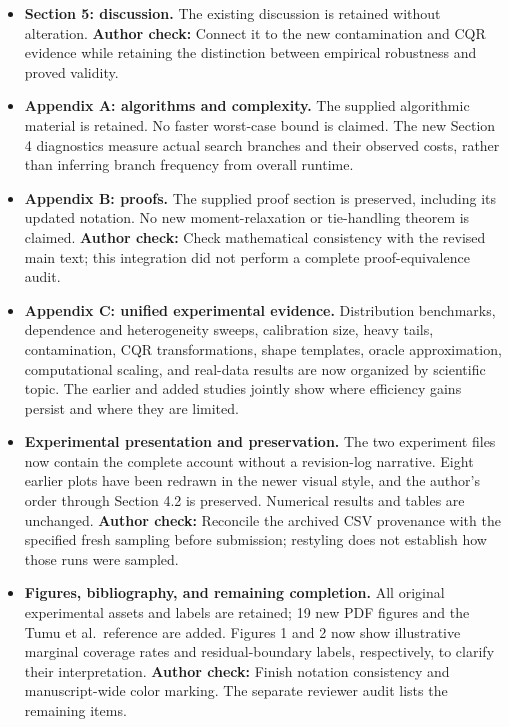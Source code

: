 \documentclass[10pt]{article}
\newcommand{\checkauthor}[1]{\textcolor{red!65!black}{\textbf{Author check:} #1}}
\begin{document}
\begin{itemize}
\item \textbf{Section 5: discussion.}
The existing discussion is retained without alteration.
\checkauthor{Connect it to the new contamination and CQR evidence while
retaining the distinction between empirical robustness and proved validity.}

\item \textbf{Appendix A: algorithms and complexity.}
The supplied algorithmic material is retained. No faster worst-case bound is
claimed. The new Section 4 diagnostics measure actual search branches and
their observed costs, rather than inferring branch frequency from overall runtime.

\item \textbf{Appendix B: proofs.}
The supplied proof section is preserved, including its updated notation.
No new moment-relaxation or tie-handling theorem is claimed.
\checkauthor{Check mathematical consistency with the revised main text; this
integration did not perform a complete proof-equivalence audit.}

\item \textbf{Appendix C: unified experimental evidence.}
Distribution benchmarks, dependence and heterogeneity sweeps, calibration
size, heavy tails, contamination, CQR transformations, shape templates,
oracle approximation, computational scaling, and real-data results are now
organized by scientific topic. The earlier and added studies jointly show
where efficiency gains persist and where they are limited.

\item \textbf{Experimental presentation and preservation.}
The two experiment files now contain the complete account without a
revision-log narrative. Eight earlier plots have been redrawn in the newer
visual style, and the author's order through Section 4.2 is preserved.
Numerical results and tables are unchanged.
\checkauthor{Reconcile the archived CSV provenance with the specified fresh
sampling before submission; restyling does not establish how those runs
were sampled.}

\item \textbf{Figures, bibliography, and remaining completion.}
All original experimental assets and labels are retained; 19 new PDF figures
and the Tumu et al.\ reference are added. Figures 1 and 2 now show illustrative
marginal coverage rates and residual-boundary labels, respectively, to clarify
their interpretation. \checkauthor{Finish notation consistency and
manuscript-wide color marking.} The separate reviewer audit lists the remaining items.
\end{itemize}
\end{document}
